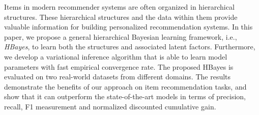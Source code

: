 Items in modern recommender systems are often organized in hierarchical structures. These hierarchical structures and the data within them provide valuable information for building personalized recommendation systems. In this paper, we propose a general hierarchical Bayesian learning framework, i.e., \emph{HBayes}, to learn both the structures and associated latent factors. Furthermore, we develop a variational inference algorithm that is able to learn model parameters with fast empirical convergence rate. The proposed HBayes is evaluated on two real-world datasets from different domains. The results demonstrate the benefits of our approach on  item recommendation tasks, and show that it can outperform the state-of-the-art models in terms of precision, recall, F1 measurement and normalized discounted cumulative gain.

